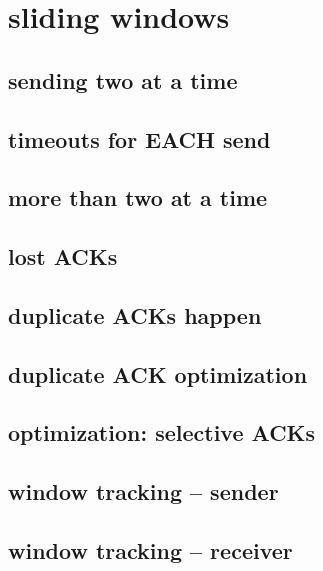 \section{sliding windows}

\subsection{sending two at a time}


\subsection{timeouts for EACH send}


\subsection{more than two at a time}


\subsection{lost ACKs}


\subsection{duplicate ACKs happen}


\subsection{duplicate ACK optimization}


\subsection{optimization: selective ACKs}


\subsection{window tracking -- sender}


\subsection{window tracking -- receiver}



